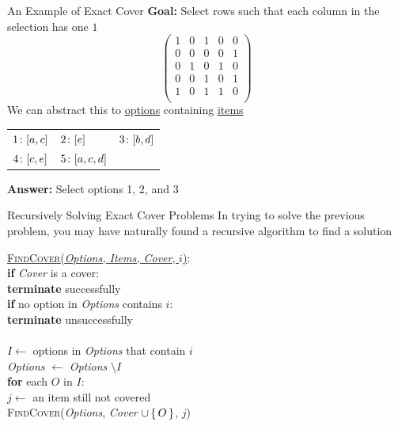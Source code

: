 \documentclass[aspectratio=169]{beamer}
\begin{document}
\begin{frame}{An Example of Exact Cover}
    \textcolor{sigma@mainblue}{\textbf{Goal:}} Select rows such that each column in the selection has one $1$
    \[
        \begin{pmatrix}
            1 & 0 & 1 & 0 & 0  \\
            0 & 0 & 0 & 0 & 1  \\
            0 & 1 & 0 & 1 & 0  \\
            0 & 0 & 1 & 0 & 1  \\
            1 & 0 & 1 & 1 & 0  \\
        \end{pmatrix}
    \] \pause 
    We can abstract this to \textcolor{sigma@mainblue}{\underline{options}} containing \textcolor{sigma@mainblue}{\underline{items}}
    \begin{table}[]
        \begin{tabular}{ l l l }
            $1\colon \bqty{a, c}$& $2\colon \bqty{e}$ & $3\colon \bqty{b, d}$ \\ 
            $4\colon \bqty{c, e}$ & $5\colon \bqty{a, c, d}$ & \\ 
        \end{tabular}
    \end{table} \pause
    \textcolor{sigma@mainblue}{\textbf{Answer:}} Select options 1, 2, and 3
\end{frame}

\begin{frame}{Recursively Solving Exact Cover Problems}
    In trying to solve the previous problem, you may have naturally found a recursive algorithm to find a solution \pause
    \begin{nalgo}
    \underline{\textsc{FindCover}(\emph{Options, Items, Cover}, $i$)}:
    \\\label{}  \textbf{if} \emph{Cover} is a cover:\+
    \\\label{}      \textbf{terminate} successfully\-
    \\\label{}  \textbf{if} no option in \emph{Options} contains $i$:\+
    \\\label{}      \textbf{terminate} unsuccessfully\-
    \\\label{}
    \\\label{}  $I \gets$ options in \emph{Options} that contain $i$
    \\\label{}  \emph{Options} $\gets$ \emph{Options} $\setminus I$
    \\\label{}  \textbf{for} each $O$ in $I$:\+
    \\\label{}      $j \gets$ an item still not covered
    \\\label{}      \textsc{FindCover}(\emph{Options}, \emph{Cover} $\cup \set{O}$, $j$)
    \end{nalgo}
\end{frame}
\end{document}
